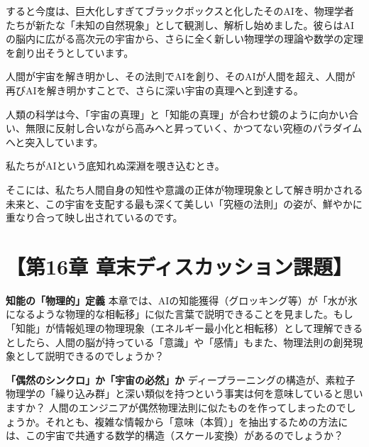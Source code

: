 すると今度は、巨大化しすぎてブラックボックスと化したそのAIを、物理学者たちが新たな「未知の自然現象」として観測し、解析し始めました。彼らはAIの脳内に広がる高次元の宇宙から、さらに全く新しい物理学の理論や数学の定理を創り出そうとしています。

人間が宇宙を解き明かし、その法則でAIを創り、そのAIが人間を超え、人間が再びAIを解き明かすことで、さらに深い宇宙の真理へと到達する。

人類の科学は今、「宇宙の真理」と「知能の真理」が合わせ鏡のように向かい合い、無限に反射し合いながら高みへと昇っていく、かつてない究極のパラダイムへと突入しています。

私たちがAIという底知れぬ深淵を覗き込むとき。

そこには、私たち人間自身の知性や意識の正体が物理現象として解き明かされる未来と、この宇宙を支配する最も深くて美しい「究極の法則」の姿が、鮮やかに重なり合って映し出されているのです。

\section*{【第16章 章末ディスカッション課題】}

\textbf{知能の「物理的」定義} 本章では、AIの知能獲得（グロッキング等）が「水が氷になるような物理的な相転移」に似た言葉で説明できることを見ました。もし「知能」が情報処理の物理現象（エネルギー最小化と相転移）として理解できるとしたら、人間の脳が持っている「意識」や「感情」もまた、物理法則の創発現象として説明できるのでしょうか？

\textbf{「偶然のシンクロ」か「宇宙の必然」か} ディープラーニングの構造が、素粒子物理学の「繰り込み群」と深い類似を持つという事実は何を意味していると思いますか？ 人間のエンジニアが偶然物理法則に似たものを作ってしまったのでしょうか。それとも、複雑な情報から「意味（本質）」を抽出するための方法には、この宇宙で共通する数学的構造（スケール変換）があるのでしょうか？




